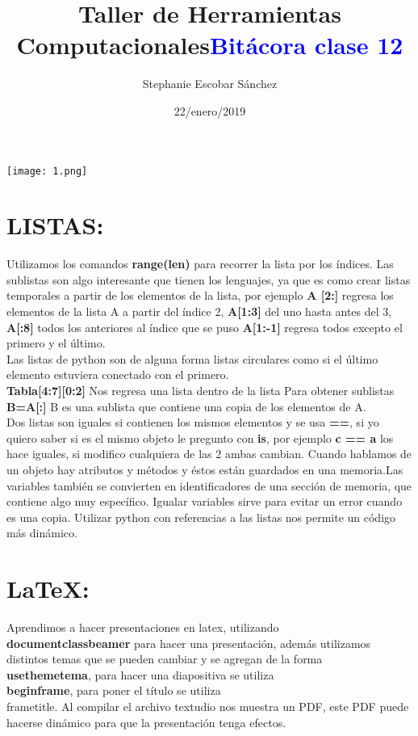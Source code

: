 \documentclass{article}
\title{\Huge Taller de Herramientas Computacionales}
\author{Stephanie Escobar Sánchez}
\date{22/enero/2019}
\begin{document}
	\maketitle
	\begin{center}
		\texttt{[image: 1.png]}	
	\end{center}
	\newpage
	\begin{center}
	\title {\textcolor{blue}{\Huge \textbf{Bitácora clase 12}} }  
	\end{center}


	\section*{LISTAS:}

	Utilizamos los comandos \textbf{range(len)} para recorrer la lista por los índices. 
	Las sublistas son algo interesante que tienen los lenguajes, ya que es como crear listas temporales a partir de los elementos de la lista, por ejemplo \textbf{A [2:]}  regresa los elementos de la lista A a partir del índice 2, \textbf{A[1:3]} del uno hasta antes del 3, \textbf{A[:8]} todos los anteriores al índice que se puso \textbf{A[1:-1]} regresa todos excepto el primero y el último.\\
	Las listas de python son de alguna forma listas circulares como si el último elemento estuviera conectado con el primero. \\
	\textbf{Tabla[4:7][0:2]} Nos regresa una lista dentro de la lista
	Para obtener sublistas\textbf{ B=A[:]} B es una sublista que contiene una copia de los elementos de A.\\
	Dos listas son iguales si contienen los mismos elementos y se usa \textbf{==}, si yo quiero saber si es el mismo objeto le pregunto con \textbf{is}, por ejemplo \textbf{c == a} los hace iguales, si modifico cualquiera de las 2 ambas cambian. 
	Cuando hablamos de un objeto hay atributos y métodos y éstos están guardados en una memoria.Las variables también se convierten en identificadores de una sección de memoria, que contiene algo muy específico. Igualar variables sirve para evitar un error cuando es una copia. Utilizar python con referencias a las listas nos permite un código más dinámico.
\section*{LaTeX:}
	Aprendimos a hacer presentaciones en latex, utilizando\textbf{\\documentclass{beamer}} para hacer una presentación, además utilizamos distintos temas que se pueden cambiar y se agregan de la forma \textbf{\\usetheme{tema}}, para hacer una diapositiva se utiliza \textbf{\\begin{frame}}, para poner el título se utiliza \\frametitle. Al compilar el archivo textudio nos muestra un PDF, este PDF puede hacerse dinámico para que la presentación tenga efectos. 
	
\end{document}

